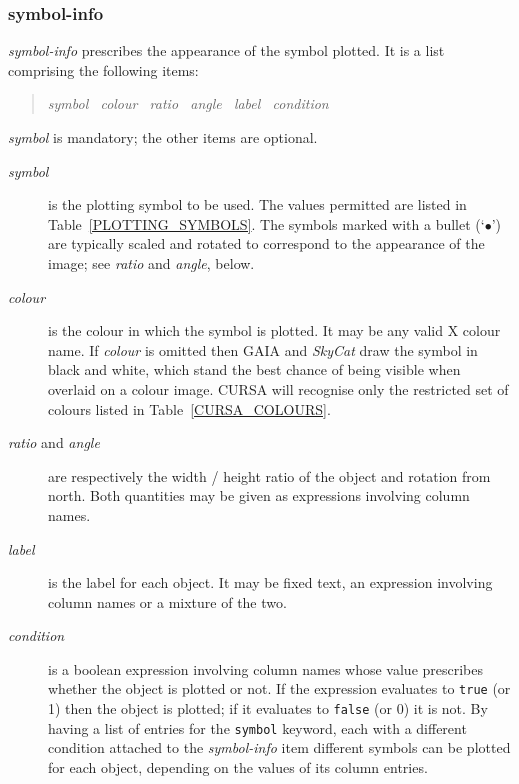 \documentclass[twoside,11pt,nolof,chapters]{starlink}
\begin{document}
\subsubsection{symbol-info \label{SYMBOLINFO_R}}

\textit{symbol-info}\/ prescribes the appearance of the symbol plotted.
It is a list comprising the following items:

\begin{quote}
\textit{symbol ~colour ~ratio ~angle ~label ~condition}
\end{quote}

\textit{symbol}\/ is mandatory; the other items are optional.

\begin{description}

  \item[\textit{symbol}] is the plotting symbol to be used.  The values
   permitted are listed in Table~\ref{PLOTTING_SYMBOLS}.  The symbols
   marked with a bullet (`$\bullet$') are typically scaled and rotated
   to correspond to the appearance of the image; see \textit{ratio}\/ and
   \textit{angle}, below.

  \item[\textit{colour}] is the colour in which the symbol is plotted.  It may
   be any valid X colour name.  If \textit{colour}\/ is omitted then GAIA
   and \textit{SkyCat}\/ draw the symbol in black and white, which stand the
   best chance of being visible when overlaid on a colour image.  CURSA
   will recognise only the restricted set of colours listed in
   Table~\ref{CURSA_COLOURS}.

  \item[\textit{ratio}\/ and \textit{angle}] are respectively the width / height
   ratio of the object and rotation from north.
   Both quantities may be given as expressions involving column names.

  \item[\textit{label}] is the label for each object.  It may be fixed text,
   an expression involving column names or a mixture of the two.

  \item[\textit{condition}] is a boolean expression involving column names
   whose value prescribes whether the object is plotted or not.  If the
   expression evaluates to \texttt{true} (or 1) then the object is plotted;
   if it evaluates to \texttt{false} (or 0) it is not.  By having a list of
   entries for the \texttt{symbol} keyword, each with a different condition
   attached to the \textit{symbol-info}\/ item different symbols can be
   plotted for each object, depending on the values of its column entries.

\end{description}
\end{document}
